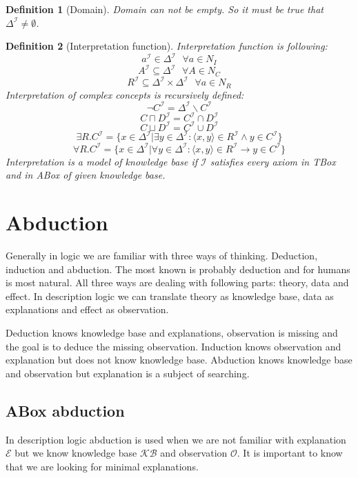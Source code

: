 \documentclass[12pt,a4paper]{article}
\newtheorem{definition}{Definition}[subsection]
\begin{document}
\begin{definition}[Domain]
	Domain can not be empty. So it must be true that $\Delta^{\mathcal{I}} \not = \emptyset$.
\end{definition}

\begin{definition}[Interpretation function]
	Interpretation function is following:
	\[ a^{\mathcal{I}} \in \Delta^{\mathcal{I}} \text{ } \forall a \in N_{I} \]
	\[ A^{\mathcal{I}} \subseteq \Delta^{\mathcal{I}} \text{ } \forall A \in N_{C} \]
	\[ R^{\mathcal{I}} \subseteq \Delta^{\mathcal{I}} \times \Delta^{\mathcal{I}} \text{ } \forall a \in N_{R} \]
	Interpretation of complex concepts is recursively defined:
	\[ \neg C^{\mathcal{I}} = \Delta^{\mathcal{I}} \backslash C^{\mathcal{I}} \]
	\[ C \sqcap D^{\mathcal{I}} = C^{\mathcal{I}} \cap D^{\mathcal{I}} \]
	\[ C \sqcup D^{\mathcal{I}} = C^{\mathcal{I}} \cup D^{\mathcal{I}} \]
	\[ \exists R.C^{\mathcal{I}} = \{ x \in \Delta^{\mathcal{I}} | \exists y \in \Delta^{\mathcal{I}} : \langle x,y \rangle \in R^{\mathcal{I}} \land y \in C^{\mathcal{I}} \} \]
	\[ \forall R.C^{\mathcal{I}} = \{ x \in \Delta^{\mathcal{I}} | \forall y \in \Delta^{\mathcal{I}} : \langle x,y \rangle \in R^{\mathcal{I}} \rightarrow y \in C^{\mathcal{I}} \} \]
	Interpretation is a model of knowledge base if $\mathcal{I}$ satisfies every axiom in \textit{TBox} and in \textit{ABox} of given knowledge base.
\end{definition}
 
\section{Abduction}
Generally in logic we are familiar with three ways of thinking. Deduction, induction and abduction. The most known is probably deduction and for humans is most natural. All three ways are dealing with following parts: theory, data and effect. In description logic we can translate theory as knowledge base, data as explanations and  effect as observation.

Deduction knows knowledge base and explanations, observation is missing and the goal is to deduce the missing observation. Induction knows observation and explanation but does not know knowledge base. Abduction knows knowledge base and observation but explanation is a subject of searching.

\subsection{ABox abduction}
In description logic abduction is used when we are not familiar with explanation $\mathcal{E}$ but we know knowledge base $\mathcal{KB}$ and observation $\mathcal{O}$. It is important to know that we are looking for minimal explanations.
\end{document}
